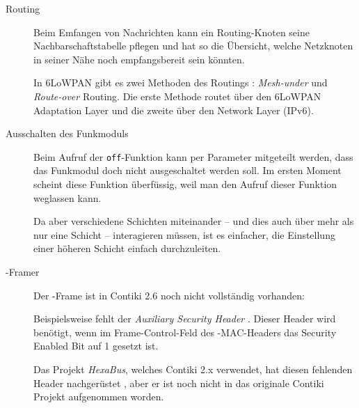 	\begin{description}
	\item[Routing]
		Beim Emfangen von Nachrichten kann ein Routing-Knoten seine
		Nachbarschaftstabelle pflegen und hat so die Übersicht, welche
		Netzknoten in seiner Nähe noch empfangsbereit sein könnten.

		In \acs{6LoWPAN} gibt es zwei Methoden des Routings
		\autocite{Chowdhury:Route-over-VS-Mesh-under-Routing}:
		\emph{Mesh-under} und \emph{Route-over} Routing.  Die erste
		Methode routet über den \acs{6LoWPAN} Adaptation Layer und die
		zweite über den Network Layer (IPv6).

	\item[Ausschalten des Funkmoduls]
		Beim Aufruf der \lstinline=off=-Funktion kann per Parameter
		mitgeteilt werden, dass das Funkmodul doch nicht ausgeschaltet
		werden soll.  Im ersten Moment scheint diese Funktion
		überfüssig, weil man den Aufruf dieser Funktion weglassen kann.

		Da aber verschiedene Schichten miteinander -- und dies auch
		über mehr als nur eine Schicht -- interagieren müssen, ist es
		einfacher, die Einstellung einer höheren Schicht einfach
		durchzuleiten.

	\item[\ieeeframe-Framer]
		Der \ieeeframe-Frame ist in Contiki 2.6 noch nicht vollständig
		vorhanden:

		Beispielsweise fehlt der \emph{Auxiliary Security Header}
		\parencite[siehe][]{IeeeFrame:SecurityHeader:ZigBee}.  Dieser
		Header wird benötigt, wenn im Frame-Control-Feld des
		\ieeeframe-MAC-Headers das Security Enabled Bit auf 1 gesetzt
		ist.

		Das Projekt \emph{HexaBus}, welches Contiki 2.x verwendet, hat
		diesen fehlenden Header nachgerüstet
		\autocite{HexabusProject:GitHub}, aber er ist noch nicht in das
		originale Contiki Projekt aufgenommen worden.
	\end{description}
